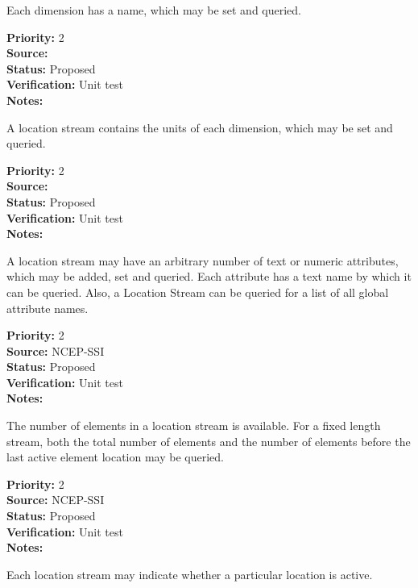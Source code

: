 Each dimension has a name, which may be set and queried.
\begin{reqlist}
{\bf Priority:} 2 \\
{\bf Source:} \\
{\bf Status:} Proposed \\
{\bf Verification:} Unit test \\
{\bf Notes:} 
\end{reqlist}

A location stream contains the units of each dimension, which may be set and queried.
\begin{reqlist}
{\bf Priority:} 2 \\
{\bf Source:} \\
{\bf Status:} Proposed \\
{\bf Verification:} Unit test \\
{\bf Notes:} 
\end{reqlist}


A location stream may have an arbitrary number of text or numeric attributes,
which may be added, set and queried.  Each attribute has a text name by which it
can be queried.  Also, a Location Stream can be queried for a list of all global
attribute names.

\begin{reqlist}
{\bf Priority:} 2 \\
{\bf Source:} NCEP-SSI \\
{\bf Status:} Proposed \\
{\bf Verification:} Unit test \\
{\bf Notes:} 
\end{reqlist}

The number of elements in a location stream is available.  For a fixed length stream,
both the total number of elements and the number of elements before the last
active element location may be queried.
\begin{reqlist}
{\bf Priority:} 2 \\
{\bf Source:} NCEP-SSI \\
{\bf Status:} Proposed \\
{\bf Verification:} Unit test \\
{\bf Notes:} 
\end{reqlist}

Each location stream may indicate whether a particular location is active.

